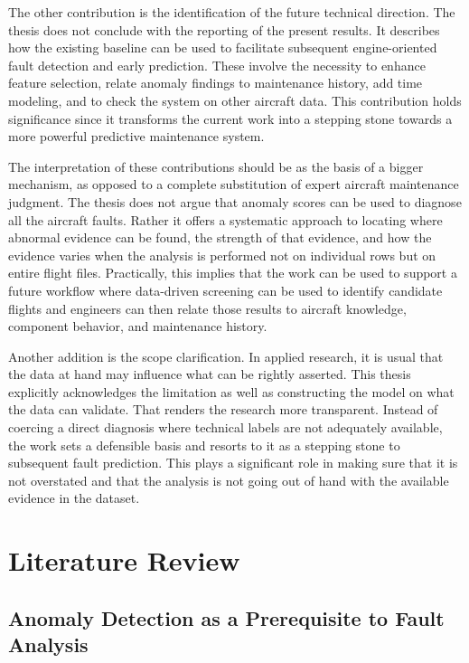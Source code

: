 \documentclass[12pt,a4paper]{report}
\begin{document}
	The other contribution is the identification of the future technical direction. The thesis does not conclude with the reporting of the present results. It describes how the existing baseline can be used to facilitate subsequent engine-oriented fault detection and early prediction. These involve the necessity to enhance feature selection, relate anomaly findings to maintenance history, add time modeling, and to check the system on other aircraft data. This contribution holds significance since it transforms the current work into a stepping stone towards a more powerful predictive maintenance system.
	
	The interpretation of these contributions should be as the basis of a bigger mechanism, as opposed to a complete substitution of expert aircraft maintenance judgment. The thesis does not argue that anomaly scores can be used to diagnose all the aircraft faults. Rather it offers a systematic approach to locating where abnormal evidence can be found, the strength of that evidence, and how the evidence varies when the analysis is performed not on individual rows but on entire flight files. Practically, this implies that the work can be used to support a future workflow where data-driven screening can be used to identify candidate flights and engineers can then relate those results to aircraft knowledge, component behavior, and maintenance history.
	
	Another addition is the scope clarification. In applied research, it is usual that the data at hand may influence what can be rightly asserted. This thesis explicitly acknowledges the limitation as well as constructing the model on what the data can validate. That renders the research more transparent. Instead of coercing a direct diagnosis where technical labels are not adequately available, the work sets a defensible basis and resorts to it as a stepping stone to subsequent fault prediction. This plays a significant role in making sure that it is not overstated and that the analysis is not going out of hand with the available evidence in the dataset.
	
	\chapter{Literature Review}
	
	\section{Anomaly Detection as a Prerequisite to Fault Analysis}
	
\end{document}
